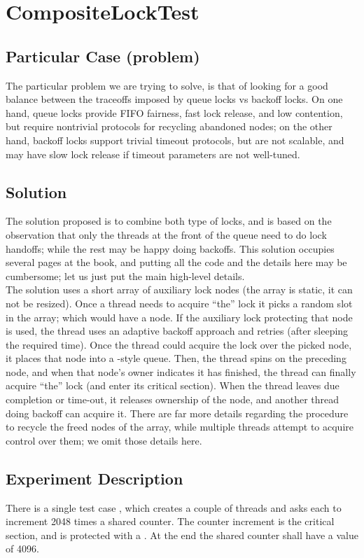 \section{\textbf{CompositeLockTest}}

\subsection{Particular Case (problem)}
The particular problem we are trying to solve, is that of looking for
a good balance between the traceoffs imposed by queue locks vs backoff
locks. On one hand, queue locks provide FIFO fairness, fast lock
release, and low contention, but require nontrivial
protocols for recycling abandoned nodes; on the other hand, backoff
locks support trivial timeout protocols, but are not scalable, and may
have slow lock release if timeout parameters are not well-tuned.

\subsection{Solution}
The solution proposed is to combine both type of locks, and is based
on the observation that only the threads at the front of the queue
need to do lock handoffs; while the rest may be happy doing
backoffs. This solution occupies several pages at the book, and
putting all the code and the details here may be cumbersome; let us
just put the main high-level details. \\

The  solution uses a short array of auxiliary lock
nodes (the array is static, it can not be resized). Once a thread
needs to acquire ``the'' lock it picks a random slot in the array;
which would have a node. If the auxiliary lock protecting that node is
used, the thread uses an adaptive backoff approach and retries (after
sleeping the required time). Once 
the thread could acquire the lock over the picked node, it places
that node into a -style queue. Then, the thread spins on
the preceding node, and when that node's owner indicates it has
finished, the thread can finally acquire ``the'' lock (and enter its
critical section). When the thread leaves due completion or time-out,
it releases ownership of the node, and another thread doing backoff 
can acquire it. There are far more details regarding the procedure to
recycle the freed nodes of the array, while multiple threads attempt
to acquire control over them; we omit those details here.

\subsection{Experiment Description}
There is a single test case , which creates a couple
of threads and asks each to increment 2048 times a shared counter. The
counter increment is the critical section, and is protected with a
. At the end the shared counter shall have a value of
4096. 

